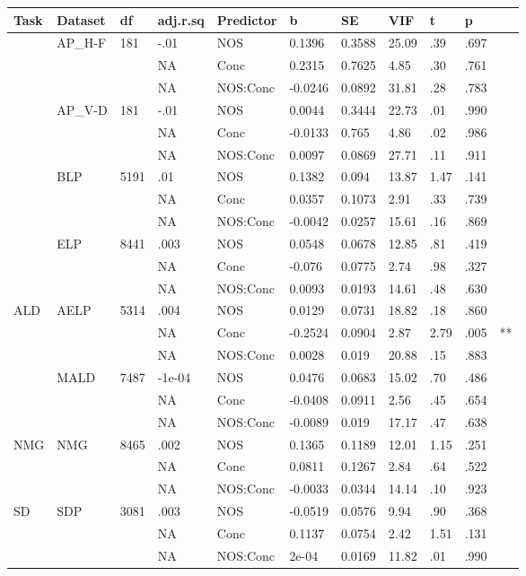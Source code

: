 \begin{table}[ht]
\centering
\begingroup\normalsize
\begin{tabular}{lllllllllll}
  \hline
Task & Dataset & df & adj.r.sq & Predictor & b & SE & VIF & t & p &  \\ 
  \hline
 & AP\_H-F & 181 & -.01 & NOS & 0.1396 & 0.3588 & 25.09 & .39 & .697 &   \\ 
   &  &  & NA & Conc & 0.2315 & 0.7625 & 4.85 & .30 & .761 &   \\ 
   &  &  & NA & NOS:Conc & -0.0246 & 0.0892 & 31.81 & .28 & .783 &   \\ 
   & AP\_V-D & 181 & -.01 & NOS & 0.0044 & 0.3444 & 22.73 & .01 & .990 &   \\ 
   &  &  & NA & Conc & -0.0133 & 0.765 & 4.86 & .02 & .986 &   \\ 
   &  &  & NA & NOS:Conc & 0.0097 & 0.0869 & 27.71 & .11 & .911 &   \\ 
   & BLP & 5191 & .01 & NOS & 0.1382 & 0.094 & 13.87 & 1.47 & .141 &   \\ 
   &  &  & NA & Conc & 0.0357 & 0.1073 & 2.91 & .33 & .739 &   \\ 
   &  &  & NA & NOS:Conc & -0.0042 & 0.0257 & 15.61 & .16 & .869 &   \\ 
   & ELP & 8441 & .003 & NOS & 0.0548 & 0.0678 & 12.85 & .81 & .419 &   \\ 
   &  &  & NA & Conc & -0.076 & 0.0775 & 2.74 & .98 & .327 &   \\ 
   &  &  & NA & NOS:Conc & 0.0093 & 0.0193 & 14.61 & .48 & .630 &   \\ 
  ALD & AELP & 5314 & .004 & NOS & 0.0129 & 0.0731 & 18.82 & .18 & .860 &   \\ 
   &  &  & NA & Conc & -0.2524 & 0.0904 & 2.87 & 2.79 & .005 & ** \\ 
   &  &  & NA & NOS:Conc & 0.0028 & 0.019 & 20.88 & .15 & .883 &   \\ 
   & MALD & 7487 & -1e-04 & NOS & 0.0476 & 0.0683 & 15.02 & .70 & .486 &   \\ 
   &  &  & NA & Conc & -0.0408 & 0.0911 & 2.56 & .45 & .654 &   \\ 
   &  &  & NA & NOS:Conc & -0.0089 & 0.019 & 17.17 & .47 & .638 &   \\ 
  NMG & NMG & 8465 & .002 & NOS & 0.1365 & 0.1189 & 12.01 & 1.15 & .251 &   \\ 
   &  &  & NA & Conc & 0.0811 & 0.1267 & 2.84 & .64 & .522 &   \\ 
   &  &  & NA & NOS:Conc & -0.0033 & 0.0344 & 14.14 & .10 & .923 &   \\ 
  SD & SDP & 3081 & .003 & NOS & -0.0519 & 0.0576 & 9.94 & .90 & .368 &   \\ 
   &  &  & NA & Conc & 0.1137 & 0.0754 & 2.42 & 1.51 & .131 &   \\ 
   &  &  & NA & NOS:Conc & 2e-04 & 0.0169 & 11.82 & .01 & .990 &   \\ 
   \hline
\end{tabular}
\endgroup
\end{table}
